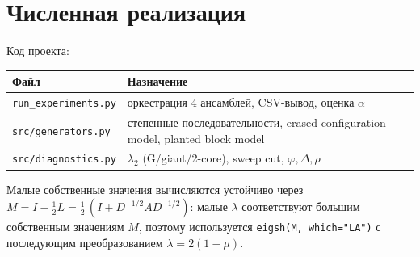 \documentclass[11pt,a4paper]{article}
\theoremstyle{plain}
\theoremstyle{definition}
\theoremstyle{remark}
\newcommand{\Ph}{\varphi}
\newcommand{\lamtwo}{\lambda_2}
\begin{document}
\appendix
\section{Численная реализация}
\label{app:code}

Код проекта:
\begin{center}
\begin{tabular}{ll}
\toprule
Файл & Назначение \\
\midrule
\texttt{run\_experiments.py} & оркестрация 4 ансамблей, CSV-вывод, оценка $\alpha$ \\
\texttt{src/generators.py} & степенные последовательности, erased configuration model, planted block model \\
\texttt{src/diagnostics.py} & $\lamtwo$ (G/giant/2-core), sweep cut, $\Ph,\Delta,\rho$ \\
\bottomrule
\end{tabular}
\end{center}

Малые собственные значения вычисляются устойчиво через
$M=I-\tfrac12 L=\tfrac12\,(I+D^{-1/2}AD^{-1/2})$: малые $\lambda$ соответствуют
большим собственным значениям $M$, поэтому используется
\texttt{eigsh(M, which="LA")} с последующим преобразованием
$\lambda=2(1-\mu)$.
\end{document}
